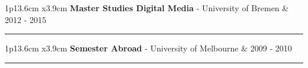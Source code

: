 \documentclass[10pt,A4]{article}
\newcommand{\cvevent}[5]
{

\begin{tabular*}{1\textwidth}{p{13.6cm}  x{3.9cm}}
	\textbf{#2} - \textcolor{bgcol}{#3} &   \vspace{1.5pt}\textcolor{sectcol}{#1}
\end{tabular*}

\vspace{-8pt}
\textcolor{softcol}{\hrule}
\vspace{6pt}


}
\begin{document}

%
\cvevent{2012 - 2015}{Master Studies Digital Media}{University of Bremen}{Inter-cultural classes in English, covering special topics in computer science and design}{Professionalized in research methods, software development and e-assessment}


%
\cvevent{2009 - 2010}{Semester Abroad}{University of Melbourne}{Mastered six months of study and trans-cultural experience in Melbourne, Australia}{Finished machine programming, information visualization, professional essay writing}


%
%
%
%
%
%
\end{document}
